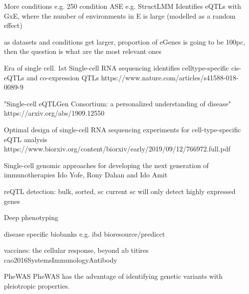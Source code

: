 \begin{outline}
    More conditions
    e.g. 250 condition ASE %
    e.g. StructLMM 
        Identifies eQTLs with GxE, where the number of environments in E is large (modelled as a random effect)

    as datasets and conditions get larger, proportion of eGenes is going to be 100pc, then the question is what are the most relevant ones

    Era of single cell.
        1st
        Single-cell RNA sequencing identifies celltype-specific cis-eQTLs and co-expression QTLs
        https://www.nature.com/articles/s41588-018-0089-9

        "Single-cell eQTLGen Consortium: a personalized understanding of disease"
        https://arxiv.org/abs/1909.12550

        Optimal design of single-cell RNA sequencing experiments for cell-type-specific eQTL analysis
        https://www.biorxiv.org/content/biorxiv/early/2019/09/12/766972.full.pdf

        Single-cell genomic approaches for developing the next generation of immunotherapies Ido Yofe, Rony Dahan and Ido Amit


        reQTL detection: bulk, sorted, sc
        current sc will only detect highly expressed genes

Deep phenotyping
        
        disease specific biobanks e.g. ibd bioresource/predicct

    vaccines:
        the cellular response, beyond ab titires cao2016SystemsImmunologyAntibody


    PheWAS\autocite{verma2017CurrentScopeChallenges}
    PheWAS has the advantage of identifying genetic variants with pleiotropic properties.


\end{outline}
